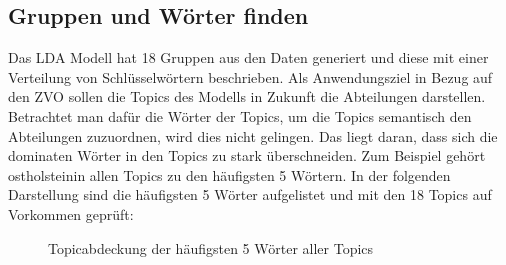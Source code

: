\documentclass[german,version-2020-11]{uzl-thesis}
\begin{document}
\subsection{Gruppen und Wörter finden}

Das LDA Modell hat 18 Gruppen aus den Daten generiert und diese mit einer Verteilung von Schlüsselwörtern beschrieben. Als Anwendungsziel in Bezug auf den ZVO sollen die Topics des Modells in Zukunft die Abteilungen darstellen. Betrachtet man dafür die Wörter der Topics, um die Topics semantisch den Abteilungen zuzuordnen, wird dies nicht gelingen. Das liegt daran, dass sich die dominaten Wörter in den Topics zu stark überschneiden. Zum Beispiel gehört \glqq ostholstein\grqq in allen Topics zu den häufigsten 5 Wörtern. In der folgenden Darstellung sind die häufigsten 5 Wörter aufgelistet und mit den 18 Topics auf Vorkommen geprüft: 

\begin{figure}[H]
\begin{center}
\caption{Topicabdeckung der häufigsten 5 Wörter aller Topics}
\label{fig:top5}
\end{center}
\end{figure}
\end{document}
